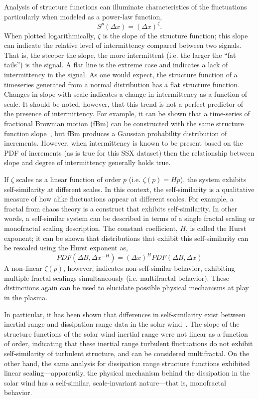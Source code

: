 \documentclass[preprint2]{aastex}
\begin{document}
Analysis of structure functions can illuminate characteristics of the fluctuations particularly when modeled as a power-law function,
\begin{equation}
S^{p}(\Delta x) = (\Delta x)^{\zeta}.
\label{eq:power-law}
\end{equation}
When plotted logarithmically, $\zeta$ is the slope of the structure function; this slope can indicate the relative level of intermittency compared between two signals. That is, the steeper the slope, the more intermittent (i.e. the larger the ``fat tails'') is the signal. A flat line is the extreme case and indicates a lack of intermittency in the signal. As one would expect, the structure function of a timeseries generated from a normal distribution has a flat structure function. Changes in slope with scale indicates a change in intermittency as a function of scale. It should be noted, however, that this trend is not a perfect predictor of the presence of intermittency. For example, it can be shown that a time-series of fractional Brownian motion (fBm) can be constructed with the same structure function slope~\citep{hnat2003}, but fBm produces a Gaussian probability distribution of increments. However, when intermittency is known to be present based on the PDF of increments (as is true for this SSX dataset) then the relationship between slope and degree of intermittency generally holds true.

If $\zeta$ scales as a linear function of order $p$ (i.e. $\zeta(p) = Hp$), the system exhibits self-similarity at different scales. In this context, the self-similarity is a qualitative measure of how alike fluctuations appear at different scales. For example, a fractal from chaos theory is a construct that exhibits self-similarity. In other words, a self-similar system can be described in terms of a single fractal scaling or monofractal scaling description. The constant coefficient, $H$, is called the Hurst exponent; it can be shown that distributions that exhibit this self-similarity can be rescaled using the Hurst exponent as,
\begin{equation}
PDF(\Delta B,\Delta x^{-H}) = (\Delta x)^HPDF(\Delta B,\Delta x)
\label{eq:scaling}
\end{equation}
A non-linear $\zeta(p)$, however, indicates non-self-similar behavior, exhibiting multiple fractal scalings simultaneously (i.e. multifractal behavior). These distinctions again can be used to elucidate possible physical mechanisms at play in the plasma. 

In particular, it has been shown that differences in self-similarity exist between inertial range and dissipation range data in the solar wind~\citep{kiyani2009,kiyani2013}. The slope of the structure functions of the solar wind inertial range were not linear as a function of order, indicating that these inertial range turbulent fluctuations do not exhibit self-similarity of turbulent structure, and can be considered multifractal. On the other hand, the same analysis for dissipation range structure functions exhibited linear scaling---apparently, the physical mechanism behind the dissipation in the solar wind has a self-similar, scale-invariant nature---that is, monofractal behavior.
\end{document}
